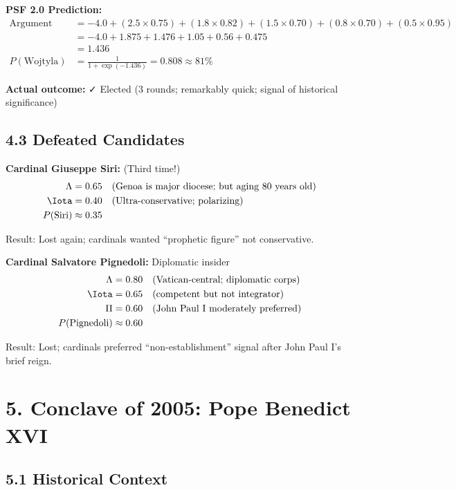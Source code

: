 \textbf{PSF 2.0 Prediction:}
\begin{align*}
\text{Argument} &= -4.0 + (2.5 \times 0.75) + (1.8 \times 0.82) + (1.5 \times 0.70) + (0.8 \times 0.70) + (0.5 \times 0.95) \\
&= -4.0 + 1.875 + 1.476 + 1.05 + 0.56 + 0.475 \\
&= 1.436 \\
P(\text{Wojtyla}) &= \frac{1}{1 + \exp(-1.436)} = 0.808 \approx 81\%
\end{align*}

\textbf{Actual outcome:} ✓ Elected (3 rounds; remarkably quick; signal of historical significance)

\subsection{4.3 Defeated Candidates}

\textbf{Cardinal Giuseppe Siri:} (Third time!)
\begin{align*}
\Lambda &= 0.65 \quad \text{(Genoa is major diocese; but aging 80 years old)} \\
\Iota &= 0.40 \quad \text{(Ultra-conservative; polarizing)} \\
P(\text{Siri}) &\approx 0.35
\end{align*}

Result: Lost again; cardinals wanted ``prophetic figure'' not conservative.

\textbf{Cardinal Salvatore Pignedoli:} Diplomatic insider
\begin{align*}
\Lambda &= 0.80 \quad \text{(Vatican-central; diplomatic corps)} \\
\Iota &= 0.65 \quad \text{(competent but not integrator)} \\
\Pi &= 0.60 \quad \text{(John Paul I moderately preferred)} \\
P(\text{Pignedoli}) &\approx 0.60
\end{align*}

Result: Lost; cardinals preferred ``non-establishment'' signal after John Paul I's brief reign.

\section{5. Conclave of 2005: Pope Benedict XVI}

\subsection{5.1 Historical Context}

